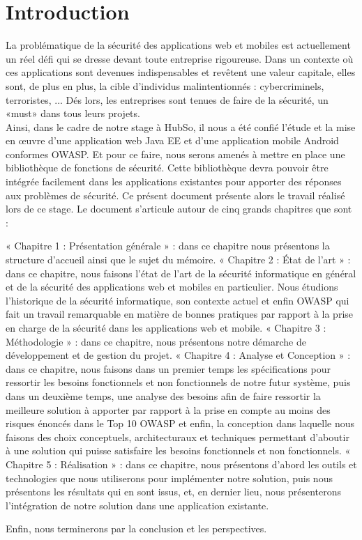 
\chapter*{Introduction}

La problématique de la sécurité des applications web et mobiles est actuellement un réel défi qui se dresse devant toute entreprise rigoureuse. Dans un contexte où ces applications sont devenues indispensables et revêtent une valeur capitale, elles sont, de plus en plus, la cible d'individus malintentionnés : cybercriminels, terroristes, ... Dés lors, les entreprises sont tenues de faire de la sécurité, un «must» dans tous leurs projets.\\
Ainsi, dans le cadre de notre stage à HubSo, il nous a été confié l'étude et la mise en œuvre d'une application web Java EE et d'une application mobile Android conformes OWASP. Et pour ce faire, nous serons amenés à mettre en place une bibliothèque de fonctions de sécurité. Cette bibliothèque devra pouvoir être intégrée facilement dans les applications existantes pour apporter des réponses aux problèmes de sécurité.
Ce présent document présente alors le travail réalisé lors de ce stage.
Le document s’articule autour de cinq grands chapitres que sont :
\begin{itemize}
	\itemcheck « Chapitre 1 : Présentation générale » : dans ce chapitre nous présentons la structure d’accueil ainsi que le sujet du mémoire.
	\itemcheck « Chapitre 2 : État de l’art » : dans ce chapitre, nous faisons
	l’état de l’art de la sécurité informatique en général et de la sécurité des applications web et mobiles en particulier. Nous étudions l'historique de la sécurité informatique, son contexte actuel et enfin OWASP qui fait un travail remarquable en matière de bonnes pratiques par rapport à la prise en charge de la sécurité dans les applications web et mobile.
	\itemcheck « Chapitre 3 : Méthodologie » : dans ce chapitre, nous présentons notre
	démarche de développement et de gestion du projet.
	\itemcheck « Chapitre 4 : Analyse et Conception » : dans ce chapitre, nous faisons dans un premier temps les spécifications pour ressortir les besoins fonctionnels et non fonctionnels de notre futur système, puis dans un deuxième temps, une analyse des besoins afin de faire ressortir la meilleure solution à apporter par rapport à la prise en compte au moins des risques énoncés dans le Top 10 OWASP  et enfin, la conception dans laquelle nous faisons des choix conceptuels, architecturaux et techniques permettant d’aboutir à une solution qui puisse satisfaire les besoins fonctionnels et non fonctionnels.
	\itemcheck « Chapitre 5 : Réalisation » : dans ce chapitre, nous présentons d’abord les outils et technologies que nous utiliserons pour implémenter notre solution, puis nous présentons les résultats qui en sont issus, et, en dernier lieu, nous présenterons l'intégration de notre solution dans une application existante.
\end{itemize}
Enfin, nous terminerons par la conclusion et les perspectives.
\clearpage
